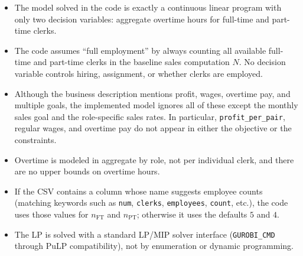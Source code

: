 \begin{itemize}
    \item The model solved in the code is exactly a continuous linear program with only two decision variables: aggregate overtime hours for full-time and part-time clerks.
    \item The code assumes ``full employment'' by always counting all available full-time and part-time clerks in the baseline sales computation $N$. No decision variable controls hiring, assignment, or whether clerks are employed.
    \item Although the business description mentions profit, wages, overtime pay, and multiple goals, the implemented model ignores all of these except the monthly sales goal and the role-specific sales rates. In particular, \texttt{profit\_per\_pair}, regular wages, and overtime pay do not appear in either the objective or the constraints.
    \item Overtime is modeled in aggregate by role, not per individual clerk, and there are no upper bounds on overtime hours.
    \item If the CSV contains a column whose name suggests employee counts (matching keywords such as \texttt{num}, \texttt{clerks}, \texttt{employees}, \texttt{count}, etc.), the code uses those values for $n_{\mathrm{FT}}$ and $n_{\mathrm{PT}}$; otherwise it uses the defaults $5$ and $4$.
    \item The LP is solved with a standard LP/MIP solver interface (\texttt{GUROBI\_CMD} through PuLP compatibility), not by enumeration or dynamic programming.
\end{itemize}
